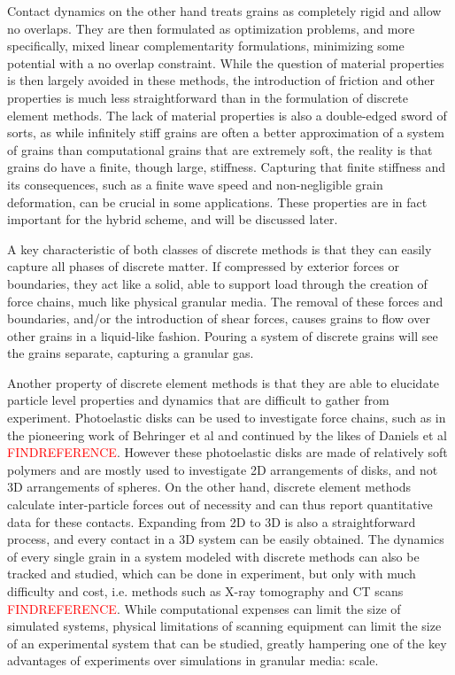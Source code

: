 Contact dynamics on the other hand treats grains as completely rigid and allow no overlaps. They are then formulated as optimization problems, and more specifically, mixed linear complementarity formulations, minimizing some potential with a no overlap constraint. While the question of material properties is then largely avoided in these methods, the introduction of friction and other properties is much less straightforward than in the formulation of discrete element methods. The lack of material properties is also a double-edged sword of sorts, as while infinitely stiff grains are often a better approximation of a system of grains than computational grains that are extremely soft, the reality is that grains do have a finite, though large, stiffness. Capturing that finite stiffness and its consequences, such as a finite wave speed and non-negligible grain deformation, can be crucial in some applications. These properties are in fact important for the hybrid scheme, and will be discussed later.

A key characteristic of both classes of discrete methods is that they can easily capture all phases of discrete matter. If compressed by exterior forces or boundaries, they act like a solid, able to support load through the creation of force chains, much like physical granular media. The removal of these forces and boundaries, and/or the introduction of shear forces, causes grains to flow over other grains in a liquid-like fashion. Pouring a system of discrete grains will see the grains separate, capturing a granular gas.

Another property of discrete element methods is that they are able to elucidate particle level properties and dynamics that are difficult to gather from experiment. Photoelastic disks can be used to investigate force chains, such as in the pioneering work of Behringer et al and continued by the likes of Daniels et al \textcolor{red}{FINDREFERENCE}. However these photoelastic disks are made of relatively soft polymers and are mostly used to investigate 2D arrangements of disks, and not 3D arrangements of spheres. On the other hand, discrete element methods calculate inter-particle forces out of necessity and can thus report quantitative data for these contacts. Expanding from 2D to 3D is also a straightforward process, and every contact in a 3D system can be easily obtained. The dynamics of every single grain in a system modeled with discrete methods can also be tracked and studied, which can be done in experiment, but only with much difficulty and cost, i.e. methods such as X-ray tomography and CT scans \textcolor{red}{FINDREFERENCE}. While computational expenses can limit the size of simulated systems, physical limitations of scanning equipment can limit the size of an experimental system that can be studied, greatly hampering one of the key advantages of experiments over simulations in granular media: scale. 

